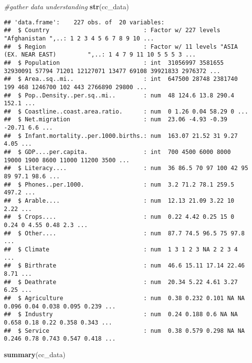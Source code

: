 \documentclass[]{article}
\newenvironment{Shaded}{\begin{snugshade}}{\end{snugshade}}
\newcommand{\CommentTok}[1]{\textcolor[rgb]{0.56,0.35,0.01}{\textit{#1}}}
\newcommand{\KeywordTok}[1]{\textcolor[rgb]{0.13,0.29,0.53}{\textbf{#1}}}
\newcommand{\NormalTok}[1]{#1}
\begin{document}
\begin{Shaded}
\begin{Highlighting}[]
\CommentTok{#gather data understanding}
\KeywordTok{str}\NormalTok{(cc_data)}
\end{Highlighting}
\end{Shaded}

\begin{verbatim}
## 'data.frame':    227 obs. of  20 variables:
##  $ Country                           : Factor w/ 227 levels "Afghanistan ",..: 1 2 3 4 5 6 7 8 9 10 ...
##  $ Region                            : Factor w/ 11 levels "ASIA (EX. NEAR EAST)         ",..: 1 4 7 9 11 10 5 5 5 3 ...
##  $ Population                        : int  31056997 3581655 32930091 57794 71201 12127071 13477 69108 39921833 2976372 ...
##  $ Area..sq..mi..                    : int  647500 28748 2381740 199 468 1246700 102 443 2766890 29800 ...
##  $ Pop..Density..per.sq..mi..        : num  48 124.6 13.8 290.4 152.1 ...
##  $ Coastline..coast.area.ratio.      : num  0 1.26 0.04 58.29 0 ...
##  $ Net.migration                     : num  23.06 -4.93 -0.39 -20.71 6.6 ...
##  $ Infant.mortality..per.1000.births.: num  163.07 21.52 31 9.27 4.05 ...
##  $ GDP....per.capita.                : int  700 4500 6000 8000 19000 1900 8600 11000 11200 3500 ...
##  $ Literacy....                      : num  36 86.5 70 97 100 42 95 89 97.1 98.6 ...
##  $ Phones..per.1000.                 : num  3.2 71.2 78.1 259.5 497.2 ...
##  $ Arable....                        : num  12.13 21.09 3.22 10 2.22 ...
##  $ Crops....                         : num  0.22 4.42 0.25 15 0 0.24 0 4.55 0.48 2.3 ...
##  $ Other....                         : num  87.7 74.5 96.5 75 97.8 ...
##  $ Climate                           : num  1 3 1 2 3 NA 2 2 3 4 ...
##  $ Birthrate                         : num  46.6 15.11 17.14 22.46 8.71 ...
##  $ Deathrate                         : num  20.34 5.22 4.61 3.27 6.25 ...
##  $ Agriculture                       : num  0.38 0.232 0.101 NA NA 0.096 0.04 0.038 0.095 0.239 ...
##  $ Industry                          : num  0.24 0.188 0.6 NA NA 0.658 0.18 0.22 0.358 0.343 ...
##  $ Service                           : num  0.38 0.579 0.298 NA NA 0.246 0.78 0.743 0.547 0.418 ...
\end{verbatim}

\begin{Shaded}
\begin{Highlighting}[]
\KeywordTok{summary}\NormalTok{(cc_data)}
\end{Highlighting}
\end{Shaded}
\end{document}
